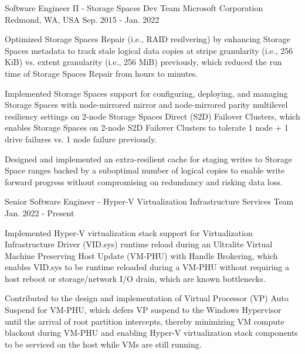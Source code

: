 

\begin{cventries}

  \cventrytwopositions
  {Software Engineer II - Storage Spaces Dev Team} %
  {Microsoft Corporation} %
  {Redmond, WA, USA} %
  {Sep. 2015 - Jan. 2022} %
  {
    \begin{cvitems} %
      \item {
        Optimized Storage Spaces Repair (i.e., RAID resilvering) by enhancing Storage
        Spaces metadata to track stale logical data copies at stripe granularity
        (i.e., 256 KiB) vs. extent granularity (i.e., 256 MiB) previously, which
        reduced the run time of Storage Spaces Repair from hours to minutes.
      }
      \item {
        Implemented Storage Spaces support for configuring, deploying, and managing
        Storage Spaces with node-mirrored mirror and node-mirrored parity multilevel
        resiliency settings on 2-node Storage Spaces Direct (S2D) Failover Clusters,
        which enables Storage Spaces on 2-node S2D Failover Clusters to tolerate 1
        node + 1 drive failures vs. 1 node failure previously.
      }
      \item {
        Designed and implemented an extra-resilient cache for staging writes to
        Storage Space ranges backed by a suboptimal number of logical copies to
        enable write forward progress without compromising on redundancy and risking
        data loss.
      }
    \end{cvitems}
  }
  {Senior Software Engineer - Hyper-V Virtualization Infrastructure Services Team} %
  {Jan. 2022 - Present} %
  {
    \begin{cvitems} %
      \item {
        Implemented Hyper-V virtualization stack support for Virtualization
        Infrastructure Driver (VID.sys) runtime reload during an Ultralite Virtual
        Machine Preserving Host Update (VM-PHU) with Handle Brokering, which enables
        VID.sys to be runtime reloaded during a VM-PHU without requiring a host
        reboot or storage/network I/O drain, which are known bottlenecks.
      }
      \item {
        Contributed to the design and implementation of Virtual Processor (VP) Auto
        Suspend for VM-PHU, which defers VP suspend to the Windows Hypervisor until
        the arrival of root partition intercepts, thereby minimizing VM compute
        blackout during VM-PHU and enabling Hyper-V virtualization stack components
        to be serviced on the host while VMs are still running.
      }
    \end{cvitems}
  }


\end{cventries}
